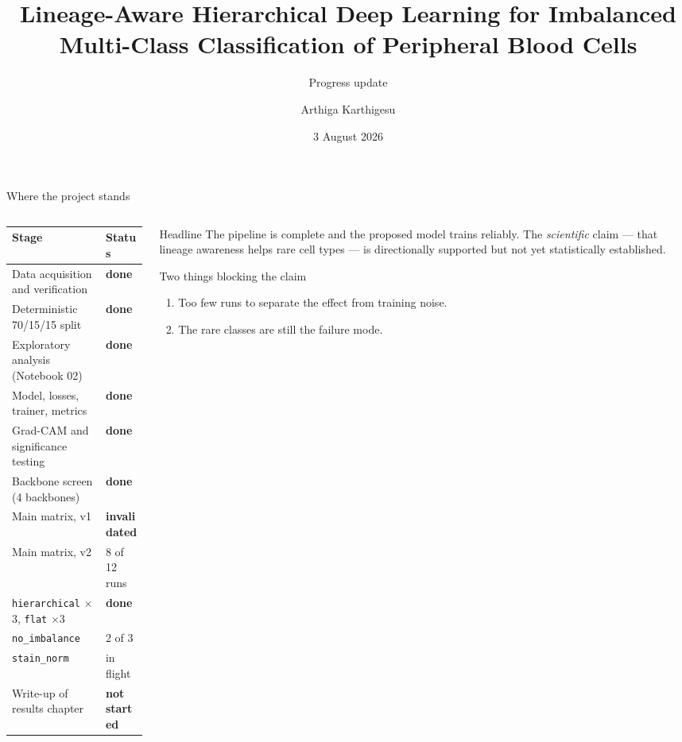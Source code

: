 \documentclass[aspectratio=169,11pt]{beamer}
\title[Progress Update]{Lineage-Aware Hierarchical Deep Learning for
Imbalanced Multi-Class Classification of Peripheral Blood Cells}
\subtitle{Progress update }
\author{Arthiga Karthigesu}
\date{3 August 2026}
\newcommand{\good}[1]{\textcolor{green!45!black}{\textbf{#1}}}
\newcommand{\bad}[1]{\textcolor{red!70!black}{\textbf{#1}}}
\begin{document}
\begin{frame}[plain]
  \titlepage
\end{frame}

\begin{frame}{Where the project stands}
  \begin{columns}[T]
    \begin{column}{0.56\textwidth}
      \small
      \begin{tabular}{@{}ll@{}}
        \toprule
        \textbf{Stage} & \textbf{Status} \\
        \midrule
        Data acquisition and verification & \good{done} \\
        Deterministic 70/15/15 split      & \good{done} \\
        Exploratory analysis (Notebook 02) & \good{done} \\
        Model, losses, trainer, metrics    & \good{done} \\
        Grad-CAM and significance testing  & \good{done} \\
        \midrule
        Backbone screen (4 backbones)      & \good{done} \\
        Main matrix, v1                    & \bad{invalidated} \\
        Main matrix, v2                    & 8 of 12 runs \\
        \quad \texttt{hierarchical} $\times$3, \texttt{flat} $\times$3 & \good{done} \\
        \quad \texttt{no\_imbalance}       & 2 of 3 \\
        \quad \texttt{stain\_norm}         & in flight \\
        \midrule
        Write-up of results chapter        & \bad{not started} \\
        \bottomrule
      \end{tabular}
    \end{column}
    \begin{column}{0.42\textwidth}
      \begin{block}{Headline}
        The pipeline is complete and the proposed model trains reliably.
        The \emph{scientific} claim --- that lineage awareness helps rare
        cell types --- is directionally supported but not yet statistically
        established.
      \end{block}
      \begin{alertblock}{Two things blocking the claim}
        \begin{enumerate}
          \item Too few runs to separate the effect from training noise.
          \item The rare classes are still the failure mode.
        \end{enumerate}
      \end{alertblock}
    \end{column}
  \end{columns}
\end{frame}
\end{document}
